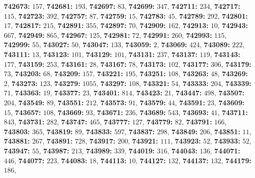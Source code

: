 \textsf{\bfseries 742673:} $157$, \textsf{\bfseries 742681:} $193$, \textsf{\bfseries 742697:} $83$, \textsf{\bfseries 742699:} $347$, \textsf{\bfseries 742711:} $234$, \textsf{\bfseries 742717:} $115$, \textsf{\bfseries 742723:} $392$, \textsf{\bfseries 742757:} $87$, \textsf{\bfseries 742759:} $15$, \textsf{\bfseries 742783:} $45$, \textsf{\bfseries 742789:} $292$, \textsf{\bfseries 742801:} $17$, \textsf{\bfseries 742817:} $215$, \textsf{\bfseries 742891:} $355$, \textsf{\bfseries 742897:} $70$, \textsf{\bfseries 742909:} $162$, \textsf{\bfseries 742913:} $10$, \textsf{\bfseries 742943:} $667$, \textsf{\bfseries 742949:} $865$, \textsf{\bfseries 742967:} $125$, \textsf{\bfseries 742981:} $72$, \textsf{\bfseries 742991:} $260$, \textsf{\bfseries 742993:} $115$, \textsf{\bfseries 742999:} $55$, \textsf{\bfseries 743027:} $50$, \textsf{\bfseries 743047:} $133$, \textsf{\bfseries 743059:} $2$, \textsf{\bfseries 743069:} $424$, \textsf{\bfseries 743089:} $222$, \textsf{\bfseries 743111:} $13$, \textsf{\bfseries 743123:} $101$, \textsf{\bfseries 743129:} $101$, \textsf{\bfseries 743131:} $237$, \textsf{\bfseries 743137:} $119$, \textsf{\bfseries 743143:} $177$, \textsf{\bfseries 743159:} $253$, \textsf{\bfseries 743161:} $28$, \textsf{\bfseries 743167:} $78$, \textsf{\bfseries 743173:} $102$, \textsf{\bfseries 743177:} $306$, \textsf{\bfseries 743179:} $73$, \textsf{\bfseries 743203:} $68$, \textsf{\bfseries 743209:} $157$, \textsf{\bfseries 743221:} $195$, \textsf{\bfseries 743251:} $108$, \textsf{\bfseries 743263:} $48$, \textsf{\bfseries 743269:} $2$, \textsf{\bfseries 743273:} $123$, \textsf{\bfseries 743279:} $1055$, \textsf{\bfseries 743297:} $108$, \textsf{\bfseries 743321:} $54$, \textsf{\bfseries 743333:} $204$, \textsf{\bfseries 743339:} $71$, \textsf{\bfseries 743363:} $19$, \textsf{\bfseries 743377:} $23$, \textsf{\bfseries 743401:} $814$, \textsf{\bfseries 743423:} $21$, \textsf{\bfseries 743447:} $498$, \textsf{\bfseries 743507:} $204$, \textsf{\bfseries 743549:} $89$, \textsf{\bfseries 743551:} $212$, \textsf{\bfseries 743573:} $91$, \textsf{\bfseries 743579:} $44$, \textsf{\bfseries 743591:} $23$, \textsf{\bfseries 743609:} $15$, \textsf{\bfseries 743657:} $108$, \textsf{\bfseries 743669:} $93$, \textsf{\bfseries 743671:} $236$, \textsf{\bfseries 743689:} $543$, \textsf{\bfseries 743693:} $41$, \textsf{\bfseries 743711:} $843$, \textsf{\bfseries 743731:} $282$, \textsf{\bfseries 743747:} $465$, \textsf{\bfseries 743777:} $127$, \textsf{\bfseries 743779:} $82$, \textsf{\bfseries 743791:} $166$, \textsf{\bfseries 743803:} $365$, \textsf{\bfseries 743819:} $89$, \textsf{\bfseries 743833:} $597$, \textsf{\bfseries 743837:} $298$, \textsf{\bfseries 743849:} $206$, \textsf{\bfseries 743851:} $11$, \textsf{\bfseries 743881:} $267$, \textsf{\bfseries 743891:} $728$, \textsf{\bfseries 743917:} $200$, \textsf{\bfseries 743921:} $111$, \textsf{\bfseries 743923:} $52$, \textsf{\bfseries 743933:} $52$, \textsf{\bfseries 743947:} $55$, \textsf{\bfseries 743987:} $213$, \textsf{\bfseries 743989:} $339$, \textsf{\bfseries 744019:} $316$, \textsf{\bfseries 744043:} $136$, \textsf{\bfseries 744071:} $446$, \textsf{\bfseries 744077:} $223$, \textsf{\bfseries 744083:} $18$, \textsf{\bfseries 744113:} $10$, \textsf{\bfseries 744127:} $132$, \textsf{\bfseries 744137:} $132$, \textsf{\bfseries 744179:} $186$, 
